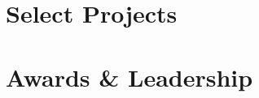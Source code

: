 \documentclass[]{_deedy-resume}
\begin{document}
\begin{minipage}[t]{0.66\textwidth}
\sectionsep


\section{Select Projects}

\sectionsep


\section{Awards \& Leadership}
\begin{tabular}{rll}
\end{tabular}
\sectionsep


\end{minipage}
\end{document}
